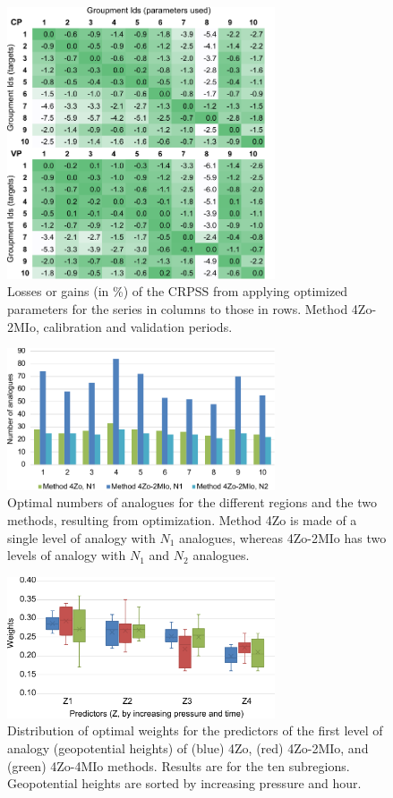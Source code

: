 \documentclass[review]{elsarticle}
\begin{document}
\begin{figure}[t]
	\centerline{\includegraphics[width=7.9cm]{fig08.pdf}}
	\caption{Losses or gains (in \%) of the CRPSS from applying optimized parameters for the series in columns to those in rows. Method 4Zo-2MIo, calibration and validation periods.}
	\label{fig:crossing_4Zo-2MIo}
\end{figure}

\begin{figure}[t]
	\centerline{\includegraphics[width=7.9cm]{fig09.pdf}}
	\caption{Optimal numbers of analogues for the different regions and the two methods, resulting from optimization. Method 4Zo is made of a single level of analogy with $N_{1}$ analogues, whereas 4Zo-2MIo has two levels of analogy with $N_{1}$ and $N_{2}$ analogues.}
	\label{fig:figure_nb_analogs}
\end{figure}

\begin{figure}[t]
	\centerline{\includegraphics[width=7.9cm]{fig10.pdf}}
	\caption{Distribution of optimal weights for the predictors of the first level of analogy (geopotential heights) of (blue) 4Zo, (red) 4Zo-2MIo, and (green) 4Zo-4MIo methods. Results are for the ten subregions. Geopotential heights are sorted by increasing pressure and hour.}
	\label{fig:levels_weights_average}
\end{figure}
\end{document}
